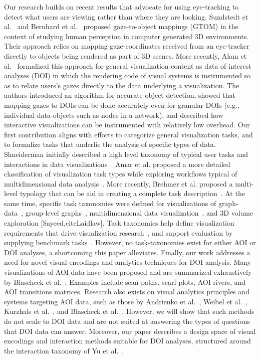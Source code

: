 Our research builds on recent results that advocate for using eye-tracking to detect what users are viewing rather than where they are looking. Sundstedt et al.~\cite{sundstedt2013visual} and Bernhard et al.~\cite{bernhard2014gaze} proposed gaze-to-object mappings (GTOM) in the context of studying human perception in computer generated 3D environments. Their approach relies on mapping gaze-coordinates received from an eye-tracker directly to objects being rendered as part of 3D scenes. More recently, Alam et al.~\cite{} formalized this approach for general visualization content as data of interest analyses (DOI) in which the rendering code of visual systems is instrumented so as to relate users’s gazes directly to the data underlying a visualization. The authors introduced an algorithm for accurate object detection, showed that mapping gazes to DOIs can be done accurately even for granular DOIs (e.g., individual data-objects such as nodes in a network), and described how interactive visualizations can be instrumented with relatively low overhead.
Our first contribution aligns with efforts to categorize general visualization tasks, and to formalize tasks that underlie the analysis of specific types of data. Shneiderman initially described a high level taxonomy of typical user tasks and interactions in data visualizations~\cite{shneiderman1996eyes}. Amar et al. proposed a more detailed classification of visualization task types while exploring workflows typical of multidimensional data analysis~\cite{amar2005low}.  More recently, Brehmer et al. proposed a multi-level typology that can be aid in creating a complete task description~\cite{brehmer2013multi}. At the same time, specific task taxonomies were defined for visualizations of graph-data~\cite{lee2006task}, group-level graphs~\cite{saket2014group}, multidimensional data  visualization~\cite{ward2002taxonomy}, and 3D volume exploration [Sayeed,citeLaidlaw]. Task taxonomies help define visualization requirements that drive visualization research~\cite{amar2005low},  and support evaluation by supplying benchmark tasks~\cite{GraphUnit,Jianu2014Groups,SaketGroupsNodeLInk,Fekete_MatrixvsNodeLink}. However, no task-taxonomies exist for either AOI or DOI analyses, a shortcoming this paper alleviates.    
Finally, our work addresses a need for novel visual encodings and analytics techniques for DOI analysis. Many visualizations of AOI data have been proposed and are summarized exhaustively by Blascheck et al.~\cite{blascheck2014state}.  Examples include scan paths, scarf plots, AOI rivers, and AOI transitions matrices. Research also exists on visual analytics principles and systems targeting AOI data, such as those by Andrienko et al.~\cite{andrienko2012visual}, Weibel et al.~\cite{weibel2012let}, Kurzhals et al.~\cite{kurzhals2014iseecube}, and Blascheck et al.~\cite{???}. However, we will show that such methods do not scale to DOI data and are not suited at answering the types of questions that DOI data can answer. Moreover, our paper describes a design space of visual encodings and interaction methods suitable for DOI analyses, structured around the interaction taxonomy of Yu et al.~\cite{???}.


